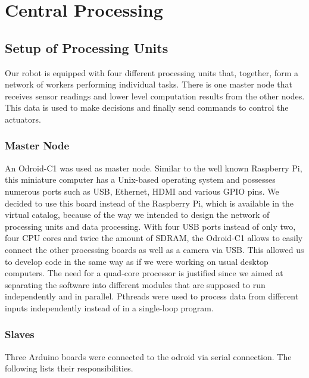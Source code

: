 %
%   
%

\chapter{Central Processing}

\section{Setup of Processing Units}
Our robot is equipped with four different processing units that, together,
form a network of workers performing individual tasks. There is one master
node that receives sensor readings and lower level computation results from
the other nodes. This data is used to make decisions and finally send 
commands to control the actuators.


\subsection{Master Node}
An Odroid-C1 was used as master node. Similar to the well known Raspberry Pi,
this miniature computer has a Unix-based operating system and possesses numerous
ports such as USB, Ethernet, HDMI and various GPIO pins. We decided to use this
board instead of the Raspberry Pi, which is available in the virtual catalog,
because of the way we intended to design the network of processing units and 
data processing. With four USB ports instead of only two, four CPU cores and twice 
the amount of SDRAM, the Odroid-C1 allows to easily connect the other processing 
boards as well as a camera via USB. This allowed us to develop code in the same
way as if we were working on usual desktop computers. The need for a quad-core 
processor is justified since we aimed at separating the software into different 
modules that are supposed to run independently and in parallel. Pthreads were
used to process data from different inputs independently instead of in a single-loop program.

\subsection{Slaves}
Three Arduino boards were connected to the odroid via serial connection. The following
lists their responsibilities.

